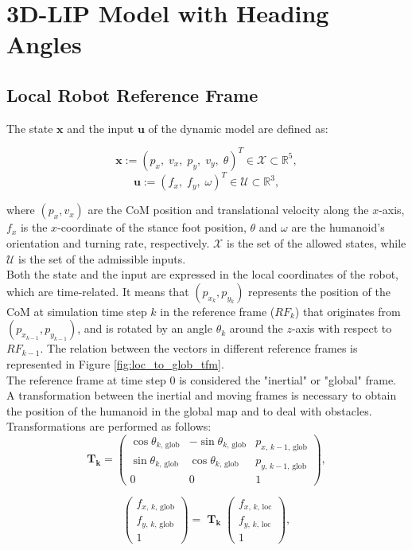 \section{3D-LIP Model with Heading Angles}\label{sec:lip}

\subsection{Local Robot Reference Frame}
The state $\mathbf{x}$ and the input $\mathbf{u}$ of the dynamic model are defined as:

$$ \mathbf{x} := \left( p_x,\; v_x,\; p_y,\; v_y,\; \theta \right)^T \in \mathcal{X} \subset \mathbb{R}^5 , $$
$$ \mathbf{u} := \left( f_x,\; f_y,\; \omega \right)^T \in \mathcal{U} \subset \mathbb{R}^3 , $$

where $(p_x, v_x)$ are the CoM position and translational velocity along the $x$-axis, $f_x$ is the $x$-coordinate of the stance foot position, $\theta$ and $\omega$ are the humanoid's orientation and turning rate, respectively. $\mathcal{X}$ is the set of the allowed states, while $\mathcal{U}$ is the set of the admissible inputs.\\
Both the state and the input are expressed in the local coordinates of the robot, which are time-related. It means that $(p_{x_k}, p_{y_k})$ represents the position of the CoM at simulation time step $k$ in the reference frame ($RF_k$) that originates from $(p_{x_{k-1}}, p_{y_{k-1}})$, and is rotated by an angle $\theta_k$ around the $z$-axis with respect to $RF_{k-1}$. The relation between the vectors in different reference frames is represented in Figure \ref{fig:loc_to_glob_tfm}.\\
The reference frame at time step 0 is considered the "inertial" or "global" frame. A transformation between the inertial and moving frames is necessary to obtain the position of the humanoid in the global map and to deal with obstacles. Transformations are performed as follows:
$$
\mathbf{T_k} = \begin{pmatrix}
\cos\theta_{k,\, \text{glob}} & -\sin\theta_{k,\, \text{glob}} & p_{x,\,k-1,\,\text{glob}} \\
\sin\theta_{k,\, \text{glob}} & \cos\theta_{k,\, \text{glob}} &  p_{y,\,k-1,\,\text{glob}} \\
0 & 0 & 1
\end{pmatrix},
$$

$$
\begin{pmatrix} f_{x,\,k,\,\text{glob} } \\ f_{y,\,k,\,\text{glob}} \\ 1 \end{pmatrix} = \; \mathbf{T_k} \;
\begin{pmatrix}
f_{x,\,k,\,\text{loc} } \\ f_{y,\,k,\,\text{loc}} \\ 1
\end{pmatrix},
$$

